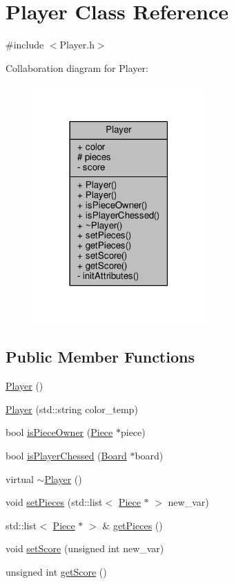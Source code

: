 \hypertarget{class_player}{}\section{Player Class Reference}
\label{class_player}


{\ttfamily \#include $<$Player.\+h$>$}



Collaboration diagram for Player\+:
\nopagebreak
\begin{figure}[H]
\begin{center}
\leavevmode
\includegraphics[width=186pt]{class_player__coll__graph}
\end{center}
\end{figure}
\subsection*{Public Member Functions}
\begin{DoxyCompactItemize}
\item 
\hyperlink{class_player_affe0cc3cb714f6deb4e62f0c0d3f1fd8}{Player} ()
\item 
\hyperlink{class_player_a355464bd2331faa49dfcc259174ac0ee}{Player} (std\+::string color\+\_\+temp)
\item 
bool \hyperlink{class_player_acd154fbc75679e8bd21ae790836c8623}{is\+Piece\+Owner} (\hyperlink{class_piece}{Piece} $\ast$piece)
\item 
bool \hyperlink{class_player_ab792f06e8da9ce878b2de013fb04b103}{is\+Player\+Chessed} (\hyperlink{class_board}{Board} $\ast$board)
\item 
virtual \hyperlink{class_player_a749d2c00e1fe0f5c2746f7505a58c062}{$\sim$\+Player} ()
\item 
void \hyperlink{class_player_a31d381a29c010c26d69a4cfd30c37049}{set\+Pieces} (std\+::list$<$ \hyperlink{class_piece}{Piece} $\ast$ $>$ new\+\_\+var)
\item 
std\+::list$<$ \hyperlink{class_piece}{Piece} $\ast$ $>$ \& \hyperlink{class_player_a479c15c00634b36e3391443afe5b9b80}{get\+Pieces} ()
\item 
void \hyperlink{class_player_ae02f0030bc93cd08c014dd48943c0304}{set\+Score} (unsigned int new\+\_\+var)
\item 
unsigned int \hyperlink{class_player_a0a4b4a42bca1b1d62be928ce234d8df5}{get\+Score} ()
\end{DoxyCompactItemize}
